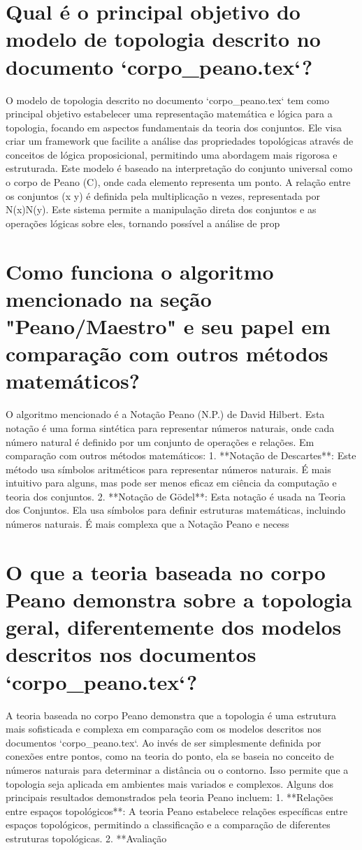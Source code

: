 \documentclass[11pt,a4paper]{article}
\begin{document}
\section{Qual é o principal objetivo do modelo de topologia descrito no documento `corpo\_peano.tex`?}
O modelo de topologia descrito no documento `corpo\_peano.tex` tem como principal objetivo estabelecer uma representação matemática e lógica para a topologia, focando em aspectos fundamentais da teoria dos conjuntos. Ele visa criar um framework que facilite a análise das propriedades topológicas através de conceitos de lógica proposicional, permitindo uma abordagem mais rigorosa e estruturada. Este modelo é baseado na interpretação do conjunto universal como o corpo de Peano (C), onde cada elemento representa um ponto. A relação entre os conjuntos (x y) é definida pela multiplicação n vezes, representada por N(x)N(y). Este sistema permite a manipulação direta dos conjuntos e as operações lógicas sobre eles, tornando possível a análise de prop

\section{Como funciona o algoritmo mencionado na seção "Peano/Maestro" e seu papel em comparação com outros métodos matemáticos?}
O algoritmo mencionado é a Notação Peano (N.P.) de David Hilbert. Esta notação é uma forma sintética para representar números naturais, onde cada número natural é definido por um conjunto de operações e relações. Em comparação com outros métodos matemáticos: 1. **Notação de Descartes**: Este método usa símbolos aritméticos para representar números naturais. É mais intuitivo para alguns, mas pode ser menos eficaz em ciência da computação e teoria dos conjuntos. 2. **Notação de Gödel**: Esta notação é usada na Teoria dos Conjuntos. Ela usa símbolos para definir estruturas matemáticas, incluindo números naturais. É mais complexa que a Notação Peano e necess

\section{O que a teoria baseada no corpo Peano demonstra sobre a topologia geral, diferentemente dos modelos descritos nos documentos `corpo\_peano.tex`?}
A teoria baseada no corpo Peano demonstra que a topologia é uma estrutura mais sofisticada e complexa em comparação com os modelos descritos nos documentos `corpo\_peano.tex`. Ao invés de ser simplesmente definida por conexões entre pontos, como na teoria do ponto, ela se baseia no conceito de números naturais para determinar a distância ou o contorno. Isso permite que a topologia seja aplicada em ambientes mais variados e complexos. Alguns dos principais resultados demonstrados pela teoria Peano incluem: 1. **Relações entre espaços topológicos**: A teoria Peano estabelece relações específicas entre espaços topológicos, permitindo a classificação e a comparação de diferentes estruturas topológicas. 2. **Avaliação
\end{document}
